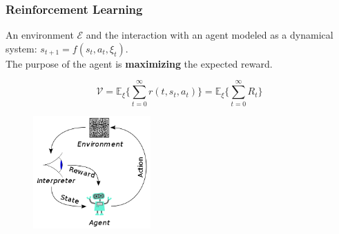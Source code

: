 \documentclass{beamer}
\begin{document}
\begin{frame}
\frametitle{Reinforcement Learning}
	An environment $\mathcal{E}$ and the interaction with an agent modeled as a dynamical system: $s_{t+1} = f(s_t, a_t, \xi_t )$.\\ The purpose of the agent is \textbf{maximizing} the expected reward.
	
	\begin{equation}
\mathcal{V} = \mathbb{E}_\xi \{ \sum_{t=0}^{\infty} r(t, s_t, a_t) \} = \mathbb{E}_\xi \{ \sum_{t=0}^{\infty}R_t \} 
	\end{equation}
	
\begin{figure}[H]
	\centering
	\includegraphics[width=0.4\textwidth]{reinforcement}
	\label{fig:rl}
\end{figure}


\end{frame}
\end{document}

